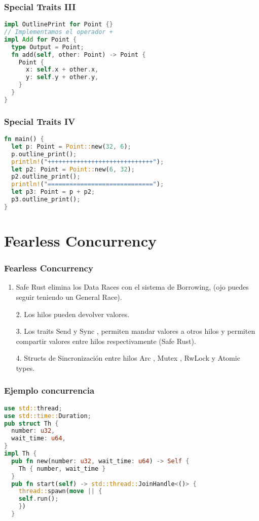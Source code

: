 \documentclass{beamer}
\begin{document}
\begin{frame}[fragile]
  \frametitle{Special Traits III}
  \begin{lstlisting}[language=Rust, style=boxed ]
impl OutlinePrint for Point {}
// Implementamos el operador +
impl Add for Point {
  type Output = Point;
  fn add(self, other: Point) -> Point {
    Point {
      x: self.x + other.x,
      y: self.y + other.y,
    }
  }
}\end{lstlisting}
\end{frame}

\begin{frame}[fragile]
  \frametitle{Special Traits IV}
  \begin{lstlisting}[language=Rust, style=boxed ]
fn main() {
  let p: Point = Point::new(32, 6);
  p.outline_print();
  println!("+++++++++++++++++++++++++++++");
  let p2: Point = Point::new(6, 32);
  p2.outline_print();
  println!("=============================");
  let p3: Point = p + p2;
  p3.outline_print();
}\end{lstlisting}
\end{frame}

\section{Fearless Concurrency}
\begin{frame}
  \frametitle{Fearless Concurrency}
  \begin{enumerate}[1.]
    \item Safe Rust elimina los Data Races con el sistema de Borrowing, (ojo puedes seguir teniendo un General Race). 
    \pause
    \item[2.] Los hilos pueden devolver valores.   
    \pause 
    \item[3.] Los traits Send y Sync , permiten mandar valores a otros hilos y permiten compartir valores entre hilos respectivamente (Safe Rust).
    \pause
    \item[4.] Structs de Sincronización entre hilos Arc , Mutex , RwLock y Atomic types.
  \end{enumerate}
\end{frame}

\begin{frame}[fragile]
  \frametitle{Ejemplo concurrencia}
  \begin{lstlisting}[language=Rust , style=boxed ]
use std::thread;
use std::time::Duration;
pub struct Th {
  number: u32,
  wait_time: u64,
}
impl Th {
  pub fn new(number: u32, wait_time: u64) -> Self {
    Th { number, wait_time }
  }
  pub fn start(self) -> std::thread::JoinHandle<()> {
    thread::spawn(move || {
    self.run();
    })
  }\end{lstlisting}
\end{frame}
\end{document}
